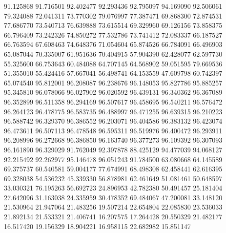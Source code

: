 91.125868
91.716501
92.402477
92.293436
92.795097
94.169090
92.506061
79.324088
72.041311
73.770302
79.076997
77.387471
69.868300
72.874531
77.686770
73.540713
76.639888
73.615514
69.329960
69.126156
73.858375
66.796409
73.242326
74.850272
77.532786
73.741412
72.083337
66.187527
66.763594
67.608463
74.648376
71.054604
65.874526
66.784091
66.496903
65.087044
70.335007
61.951636
70.404915
57.904390
62.428077
62.597730
55.325600
66.753643
60.484088
64.707145
64.568902
59.051595
79.669536
51.355010
55.424416
57.667041
56.498741
64.153559
47.609798
60.742397
65.074540
95.812001
96.208087
96.238676
96.148053
95.827786
95.885257
95.345810
96.078066
96.027902
96.020592
96.439131
96.340362
96.367089
96.352899
96.511358
96.294169
96.507617
96.458695
96.540211
96.576472
96.264123
96.478775
96.583735
96.488997
96.471255
96.639315
96.210223
96.588742
96.329370
96.386552
96.203071
96.404586
96.383132
96.423074
96.473611
96.507113
96.478548
96.595311
96.519976
96.400472
96.293911
96.208996
96.272668
96.386850
96.163740
96.377273
96.109392
96.307093
96.161890
96.329029
91.762049
92.397878
88.425129
94.477039
94.068127
92.215492
92.262977
95.146478
96.051243
91.784500
63.080668
64.145589
69.375737
60.540581
59.004177
77.674991
68.498308
62.458441
62.616395
69.328038
54.536232
45.339330
56.878981
62.461649
51.081461
50.648597
33.030321
76.195263
56.692723
24.896953
42.782380
50.491457
25.181404
27.642096
31.163038
24.335959
30.478352
69.484067
47.200081
33.148120
21.530964
21.947064
21.483256
19.507214
22.654804
22.085830
23.536033
21.892134
21.533321
21.406741
16.207575
17.264428
20.550329
21.482177
16.517420
19.156329
18.904221
16.958115
22.682982
15.851147
